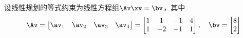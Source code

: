 \documentclass{ctexart}
\begin{document}
\begin{example}
    设线性规划的等式约束为线性方程组$\Av \xv = \bv$，其中
    \begin{align*}
        \Av = \begin{bmatrix}
                  \av_1 & \av_2 & \av_3 & \av_4
              \end{bmatrix} = \begin{bmatrix}
                                  1 & 1 & -1 & 4 \\ 1 & -2 & -1 & 1
                              \end{bmatrix}, \quad \bv = \begin{bmatrix}
                                                             8 \\ 2
                                                         \end{bmatrix}
    \end{align*}


\end{example}
\end{document}
